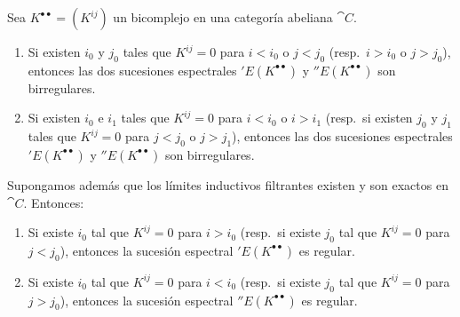 \documentclass[oneside]{amsart}
\let\EGAOriginalLabel\label
\renewcommand{\label}[1]{\phantomsection\EGAOriginalLabel{#1}}
\begin{document}
\begin{proposition}[11.3.3]
\label{0.11.3.3}
Sea $K^{\bullet\bullet}=(K^{ij})$ un bicomplejo en una categoría abeliana $\cat{C}$.
\begin{enumerate}
  \item[{\rm(i)}] Si existen $i_0$ y $j_0$ tales que $K^{ij}=0$ para $i<i_0$ o $j<j_0$ \textup{(resp.}~$i>i_0$ o $j>j_0$), entonces las dos sucesiones espectrales $'E(K^{\bullet\bullet})$ y $''E(K^{\bullet\bullet})$ son birregulares.
  \item[{\rm(ii)}] Si existen $i_0$ e $i_1$ tales que $K^{ij}=0$ para $i<i_0$ o $i>i_1$ \textup{(resp.}~si existen $j_0$ y $j_1$ tales que $K^{ij}=0$ para $j<j_0$ o $j>j_1$), entonces las dos sucesiones espectrales $'E(K^{\bullet\bullet})$ y $''E(K^{\bullet\bullet})$ son birregulares.
\end{enumerate}
Supongamos además que los límites inductivos filtrantes existen y son exactos en $\cat{C}$. Entonces:
\begin{enumerate}
  \item[{\rm(iii)}] Si existe $i_0$ tal que $K^{ij}=0$ para $i>i_0$ \textup{(resp.}~si existe $j_0$ tal que $K^{ij}=0$ para $j<j_0$), entonces la sucesión espectral $'E(K^{\bullet\bullet})$ es regular.
  \item[{\rm(iv)}] Si existe $i_0$ tal que $K^{ij}=0$ para $i<i_0$ \textup{(resp.}~si existe $j_0$ tal que $K^{ij}=0$ para $j>j_0$), entonces la sucesión espectral $''E(K^{\bullet\bullet})$ es regular.
\end{enumerate}
\end{proposition}
\end{document}
